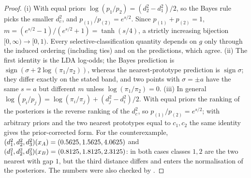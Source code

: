 \documentclass[10pt,a4paper]{article}
\theoremstyle{plain}
\theoremstyle{definition}
\theoremstyle{remark}
\newcommand{\dd}{d^2}
\begin{document}
\begin{proof}
(i) With equal priors $\log(p_1/p_2)=(\dd_2-\dd_1)/2$, so the Bayes rule picks the smaller $\dd_c$, and $p_{(1)}/p_{(2)}=e^{s/2}$. Since $p_{(1)}+p_{(2)}=1$, $m=(e^{s/2}-1)/(e^{s/2}+1)=\tanh(s/4)$, a strictly increasing bijection $[0,\infty)\to[0,1)$. Every selective-classification quantity depends on $g$ only through the induced ordering (including ties) and on the predictions, which agree. (ii) The first identity is the LDA log-odds; the Bayes prediction is $\operatorname{sign}(\sigma+2\log(\pi_1/\pi_2))$, whereas the nearest-prototype prediction is $\operatorname{sign}\sigma$; they differ exactly on the stated band, and two points with $\sigma=\pm a$ have the same $s=a$ but different $m$ unless $\log(\pi_1/\pi_2)=0$. (iii) In general $\log(p_i/p_j)=\log(\pi_i/\pi_j)+(\dd_j-\dd_i)/2$. With equal priors the ranking of the posteriors is the reverse ranking of the $\dd_c$, so $p_{(1)}/p_{(2)}=e^{s/2}$; with arbitrary priors and the two nearest prototypes equal to $c_1,c_2$ the same identity gives the prior-corrected form. For the counterexample, $(\dd_1,\dd_2,\dd_3)(x_A)=(\CexDtwoA)$ and $(\dd_1,\dd_2,\dd_3)(x_B)=(\CexDtwoB)$: in both cases classes $1,2$ are the two nearest with gap $1$, but the third distance differs and enters the normalisation of the posteriors. The numbers were also checked by .
\end{proof}
\end{document}
